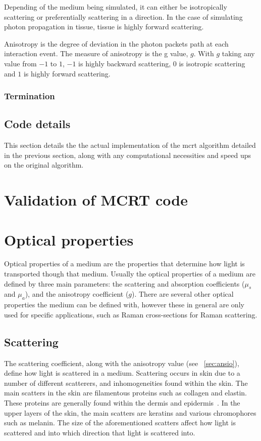 Depending of the medium being simulated, it can either be isotropically scattering or preferentially scattering in a direction. In the case of simulating photon propagation in tissue, tissue is highly forward scattering.

Anisotropy is the degree of deviation in the photon packets path at each interaction event. The measure of anisotropy is the g value, $g$. With $g$ taking any value from $-1$ to $1$, $-1$ is highly backward scattering, $0$ is isotropic scattering and $1$ is highly forward scattering. 


\subsubsection{Termination}\label{sec:terminator}

\subsection{Code details}

This section details the the actual implementation of the \gls{mcrt} algorithm detailed in the previous section, along with any computational necessities and speed ups on the original algorithm.

\section{Validation of MCRT code}
\section{Optical properties}\label{sec:optprop}

Optical properties of a medium are the properties that determine how light is transported though that medium. Usually the optical properties of a medium are defined by three main parameters: the scattering and absorption coefficients ($\mu_s$ and $\mu_a$), and the anisotropy coefficient ($g$). There are several other optical properties the medium can be defined with, however these in general are only used for specific applications, such as Raman cross-sections for Raman scattering.

\subsection{Scattering}\label{sec:scatt}

The scattering coefficient, along with the anisotropy value (see ~\cref{sec:ansio}), define how light is scattered in a medium. Scattering occurs in skin due to a number of different scatterers, and inhomogeneities found within the skin. The main scatters in the skin are filamentous proteins such as collagen and elastin. These proteins are generally found within the dermis and epidermis~\cite{jacques1996origins}. In the upper layers of the skin, the main scatters are keratins and various chromophores such as melanin. 
The size of the aforementioned scatters affect how light is scattered and into which direction that light is scattered into.

